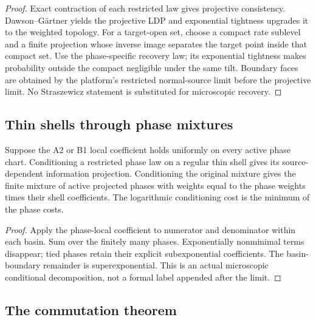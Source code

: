 \begin{proof}
Exact contraction of each restricted law gives projective consistency.
Dawson--G\"artner yields the projective LDP and exponential tightness upgrades
it to the weighted topology.  For a target-open set, choose a compact rate
sublevel and a finite projection whose inverse image separates the target
point inside that compact set.  Use the phase-specific recovery law; its
exponential tightness makes probability outside the compact negligible under
the same tilt.  Boundary faces are obtained by the platform's restricted
normal-source limit before the projective limit.  No Straszewicz statement is
substituted for microscopic recovery.
\end{proof}

\subsection{Thin shells through phase mixtures}

\begin{theorem}
\label{thm:r10-d1-shell}
Suppose the A2 or B1 local coefficient holds uniformly on every active phase
chart.  Conditioning a restricted phase law on a regular thin shell gives its
source-dependent information projection.  Conditioning the original mixture
gives the finite mixture of active projected phases with weights equal to the
phase weights times their shell coefficients.  The logarithmic conditioning
cost is the minimum of the phase costs.
\end{theorem}

\begin{proof}
Apply the phase-local coefficient to numerator and denominator within each
basin.  Sum over the finitely many phases.  Exponentially nonminimal terms
disappear; tied phases retain their explicit subexponential coefficients.
The basin-boundary remainder is superexponential.  This is an actual
microscopic conditional decomposition, not a formal label appended after the
limit.
\end{proof}

\subsection{The commutation theorem}

